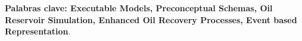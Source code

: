 \textbf{\small Palabras clave: Executable Models, Preconceptual Schemas, Oil Reservoir Simulation, Enhanced Oil Recovery Processes, Event based Representation}.\\

